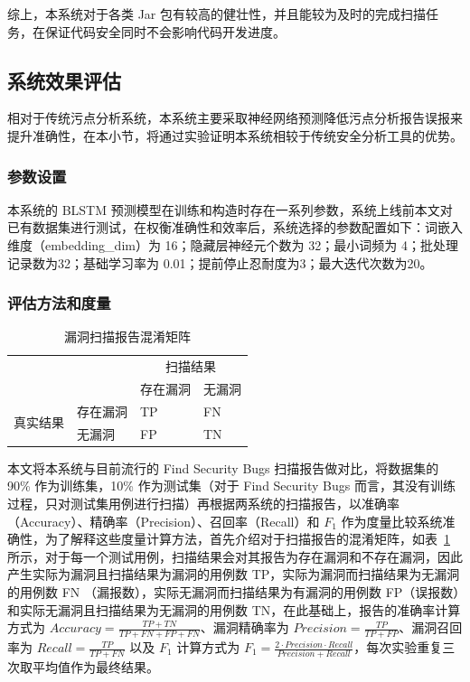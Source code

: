 综上，本系统对于各类 Jar 包有较高的健壮性，并且能较为及时的完成扫描任务，在保证代码安全同时不会影响代码开发进度。

\subsection{系统效果评估}

相对于传统污点分析系统，本系统主要采取神经网络预测降低污点分析报告误报来提升准确性，在本小节，将通过实验证明本系统相较于传统安全分析工具的优势。

\subsubsection{参数设置}
本系统的 BLSTM 预测模型在训练和构造时存在一系列参数，系统上线前本文对已有数据集进行测试，在权衡准确性和效率后，系统选择的参数配置如下：词嵌入维度（embedding\_dim）为 16；隐藏层神经元个数为 32；最小词频为 4；批处理记录数为32；基础学习率为 0.01；提前停止忍耐度为3；最大迭代次数为20。

\subsubsection{评估方法和度量}
\begin{table}[htbp]\footnotesize
    \centering
    \caption{漏洞扫描报告混淆矩阵}
    \begin{tabular}{clll}
        \toprule
        \multicolumn{2}{c}{\multirow{2}[4]{*}{}} & \multicolumn{2}{c}{扫描结果} \\
        \cmidrule{3-4}    \multicolumn{2}{c}{} & 存在漏洞  & 无漏洞 \\
        \midrule
        \multirow{2}[2]{*}{真实结果} & 存在漏洞  & TP    & FN \\
        & 无漏洞   & FP    & TN \\
        \bottomrule
    \end{tabular}%
    \label{tab:confusionMatrix}%
\end{table}

本文将本系统与目前流行的 Find Security Bugs 扫描报告做对比，将数据集的 90\% 作为训练集，10\% 作为测试集（对于 Find Security Bugs 而言，其没有训练过程，只对测试集用例进行扫描）再根据两系统的扫描报告，以准确率（Accuracy）、精确率（Precision）、召回率（Recall）和 $F_{1}$ 作为度量比较系统准确性，为了解释这些度量计算方法，首先介绍对于扫描报告的混淆矩阵，如表~\ref{tab:confusionMatrix} 所示，对于每一个测试用例，扫描结果会对其报告为存在漏洞和不存在漏洞，因此产生实际为漏洞且扫描结果为漏洞的用例数 TP，实际为漏洞而扫描结果为无漏洞的用例数 FN （漏报数），实际无漏洞而扫描结果为有漏洞的用例数 FP（误报数）和实际无漏洞且扫描结果为无漏洞的用例数 TN，在此基础上，报告的准确率计算方式为 $Accuracy=\frac{TP+TN}{TP+FN+FP+FN}$、漏洞精确率为 $Precision=\frac{TP}{TP+FP}$、漏洞召回率为 $Recall=\frac{TP}{TP+FN}$ 以及 $F_1$ 计算方式为 $F_{1}=\frac{2 \cdot Precision \cdot Recall}{Precision+Recall}$，每次实验重复三次取平均值作为最终结果。

